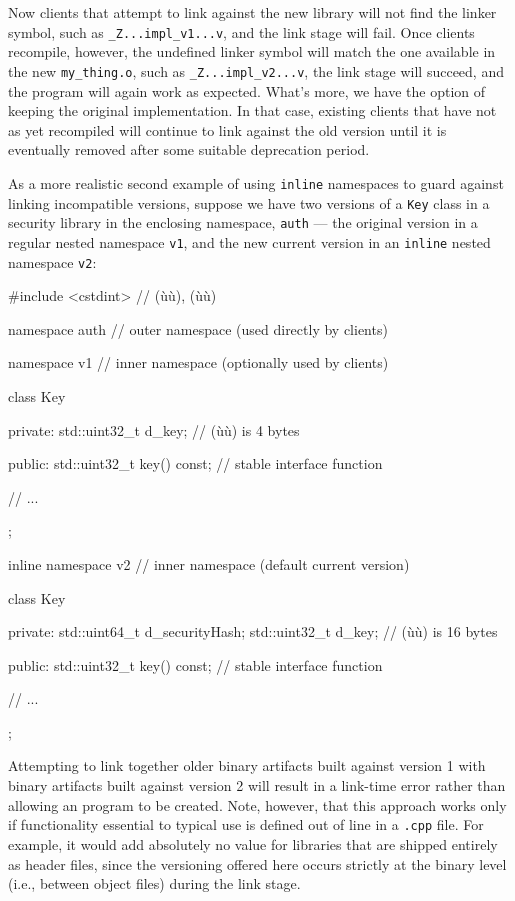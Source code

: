 \noindent Now clients that attempt to link against the new library will not find
the linker symbol, such as \lstinline!_Z...impl_v1...v!, and the link
stage will fail. Once clients recompile, however, the undefined linker
symbol will match the one available in the new \lstinline!my_thing.o!,
such as \lstinline!_Z...impl_v2...v!, the link stage will succeed, and
the program will again work as expected. What's more, we have the option
of keeping the original implementation. In that case, existing clients
that have not as yet recompiled will continue to link against the old
version until it is eventually removed after some suitable deprecation
period.

As a more realistic second example of using \lstinline!inline! namespaces
to guard against linking incompatible versions, suppose we have two
versions of a \lstinline!Key! class in a security library in the enclosing
namespace, \lstinline!auth! --- the original version in a regular nested
namespace \lstinline!v1!, and the new current version in an \lstinline!inline!
nested namespace \lstinline!v2!:

\begin{emcppslisting}
#include <cstdint>  // (ù{}ù), (ù{}ù)

namespace auth      // outer namespace (used directly by clients)
{
    namespace v1    // inner namespace (optionally used by clients)
    {
        class Key
        {
        private:
            std::uint32_t d_key;
                // (ù{}ù) is 4 bytes

        public:
            std::uint32_t key() const;  // stable interface function

            // ...
        };
    }

    inline namespace v2    // inner namespace (default current version)
    {
        class Key
        {
        private:
            std::uint64_t d_securityHash;
            std::uint32_t d_key;
                // (ù{}ù) is 16 bytes

        public:
            std::uint32_t key() const;  // stable interface function

            // ...
        };
    }
}
\end{emcppslisting}
    
\noindent Attempting to link together older binary artifacts built against version
1 with binary artifacts built against version 2 will result in a
link-time error rather than allowing an  program to
be created. Note, however, that this approach works only if functionality essential
to typical use is defined out of line in a \lstinline!.cpp! file. For example, it would add absolutely no value for libraries that are
shipped entirely as header files, since the versioning offered here
occurs strictly at the binary level (i.e., between object files)
during the link stage.

